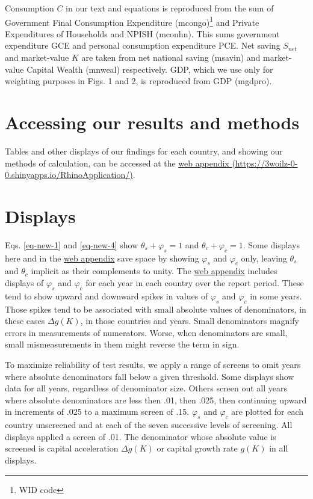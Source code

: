 Consumption $C$ in our text and equations is reproduced from the sum of Government Final Consumption Expenditure (mcongo)\footnote{\label{widnote}WID code} and Private Expenditures of Households and NPISH (mconhn). This sums government expenditure GCE and personal consumption expenditure PCE. Net saving $S_{net}$ and market-value $K$ are taken from net national saving (msavin) and market-value Capital Wealth (mnweal) respectively. GDP, which we use only for weighting purposes in Figs. 1 and 2, is reproduced from GDP (mgdpro).

\hypertarget{accessing-our-results-and-methods}{%
\section{Accessing our results and
methods}\label{accessing-our-results-and-methods}}

Tables and other displays of our findings for each country, and showing
our methods of calculation, can be accessed at the
\href{https://3woilz-0-0.shinyapps.io/RhinoApplication/}{web appendix (https://3woilz-0-0.shinyapps.io/RhinoApplication/)}.

\hypertarget{sec-displays}{%
\section{Displays}\label{sec-displays}}

Eqs. \eqref{eq-new-1} and \eqref{eq-new-4} show
\(\theta_s + \varphi_s = 1\) and \(\theta_c + \varphi_c = 1\). Some
displays here and in the
\href{https://3woilz-0-0.shinyapps.io/RhinoApplication/}{web appendix}
save space by showing \(\varphi_s\) and \(\varphi_c\) only, leaving
\(\theta_s\) and \(\theta_c\) implicit as their complements to unity.
The \href{https://3woilz-0-0.shinyapps.io/RhinoApplication/}{web
appendix} includes displays of \(\varphi_s\) and \(\varphi_c\) for
each year in each country over the report period. These tend to show
upward and downward spikes in values of \(\varphi_s\) and \(\varphi_c\)
in some years. Those spikes tend to be associated with small absolute
values of denominators, in these cases \(\Delta g(K)\), in those
countries and years. Small denominators magnify errors in measurements
of numerators. Worse, when denominators are small, small mismeasurements in them might reverse the term in sign.

To maximize reliability of test results, we apply a range of screens to
omit years where absolute denominators fall below a given
threshold. Some displays show data for all years, regardless of denominator size.
Others screen out all years where
absolute denominators are less then .01, then .025, then continuing upward in
increments of .025 to a maximum screen of .15. \(\varphi_s\) and
\(\varphi_c\) are plotted for each country unscreened and at each of the
seven successive levels of screening. All displays applied a screen of .01. 
The denominator whose absolute value is screened is capital acceleration
$\Delta g(K)$ or capital growth rate \(g(K)\) in all displays. 

